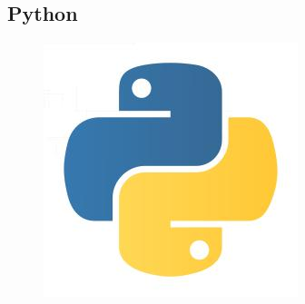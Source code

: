 \newpage

\subsection{Python}

\begin{figure}[!ht]
	\center
	\includegraphics[scale=0.4]{img/python.jpeg}
\end{figure}

